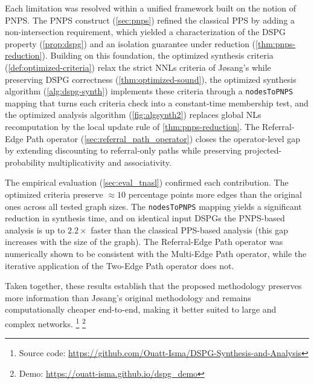 Each limitation was resolved within a unified framework built on the notion of \acf{PNPS}. The \ac{PNPS} construct (\cref{sec:pnps}) refined the classical \ac{PPS} by adding a non-intersection requirement, which yielded a characterization of the \ac{DSPG} property (\cref{prop:dspg}) and an isolation guarantee under reduction (\cref{thm:pnps-reduction}). Building on this foundation, the optimized synthesis criteria (\cref{def:optimized-criteria}) relax the strict \acp{NNL} criteria of J{\o}sang's while preserving \ac{DSPG} correctness (\cref{thm:optimized-sound}), the optimized synthesis algorithm (\cref{alg:dspg-synth}) implements these criteria through a \texttt{nodesToPNPS} mapping that turns each criteria check into a constant-time membership test, and the optimized analysis algorithm (\cref{fig:algsynth2}) replaces global \acp{NL} recomputation by the local update rule of \cref{thm:pnps-reduction}. The Referral-Edge Path operator (\cref{sec:referral_path_operator}) closes the operator-level gap by extending discounting to referral-only paths while preserving projected-probability multiplicativity and associativity.

The empirical evaluation (\cref{sec:eval_tnasl}) confirmed each contribution. The optimized criteria preserve $\approx\!10$ percentage points more edges than the original ones across all tested graph sizes. The \texttt{nodesToPNPS} mapping yields a significant reduction in synthesis time, and on identical input \acp{DSPG} the \ac{PNPS}-based analysis is up to $2.2\times$ faster than the classical \ac{PPS}-based analysis (this gap increases with the size of the graph). The Referral-Edge Path operator was numerically shown to be consistent with the Multi-Edge Path operator, while the iterative application of the Two-Edge Path operator does not.

Taken together, these results establish that the proposed methodology preserves more information than J{\o}sang's original methodology and remains computationally cheaper end-to-end, making it better suited to large and complex networks.
{\let\thefootnote\relax\footnote{Source code: \url{https://github.com/Ouatt-Isma/DSPG-Synthesis-and-Analysis}}}
{\let\thefootnote\relax\footnote{Demo: \url{https://ouatt-isma.github.io/dspg_demo}}}